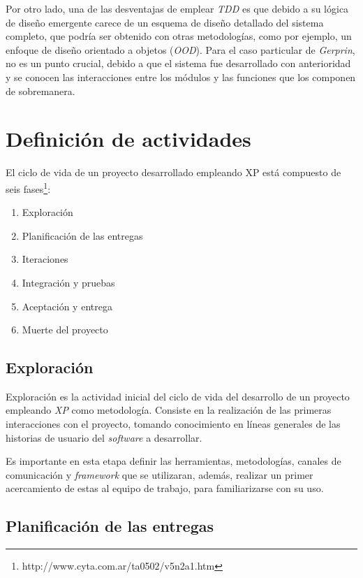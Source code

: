 Por otro lado, una de las desventajas de emplear \emph{TDD} es que debido a su lógica de diseño emergente carece de un esquema de diseño detallado del sistema completo, que podría ser obtenido con otras metodologías, como por ejemplo, un enfoque de diseño orientado a objetos (\emph{OOD}).  Para el caso particular de \emph{Gerprin}, no es un punto crucial, debido a que el sistema fue desarrollado con anterioridad y se conocen las interacciones entre los módulos y las funciones que los componen de sobremanera.

\section{Definición de actividades}

El ciclo de vida de un proyecto desarrollado empleando XP está compuesto de seis fases\footnote{http://www.cyta.com.ar/ta0502/v5n2a1.htm}:  

\begin{enumerate}
	\item Exploración
	\item Planificación de las entregas
	\item Iteraciones
	\item Integración y pruebas
	\item Aceptación y entrega
	\item Muerte del proyecto
\end{enumerate}

\subsection{Exploración}

Exploración es la actividad inicial del ciclo de vida del desarrollo de un proyecto empleando \emph{XP} como metodología. Consiste en la realización de las primeras interacciones con el proyecto, tomando conocimiento en líneas generales de las historias de usuario del \emph{software} a desarrollar. 

Es importante en esta etapa definir las herramientas, metodologías, canales de comunicación y \emph{framework} que se utilizaran, además, realizar un primer acercamiento de estas al equipo de trabajo, para familiarizarse con su uso.

\subsection{Planificación de las entregas}

